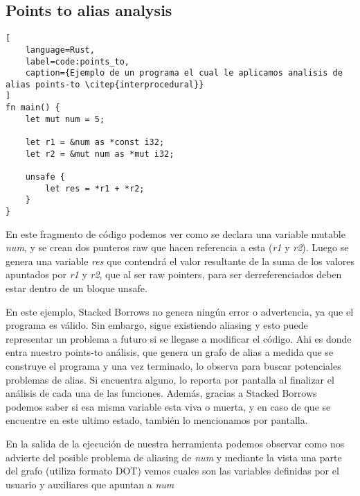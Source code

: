 \subsection{Points to alias analysis}

\begin{lstlisting}[
    language=Rust,
    label=code:points_to,
    caption={Ejemplo de un programa el cual le aplicamos analisis de alias points-to \citep{interprocedural}}
]
fn main() {
    let mut num = 5;

    let r1 = &num as *const i32;
    let r2 = &mut num as *mut i32;

    unsafe {
        let res = *r1 + *r2;
    }
}
\end{lstlisting}

En este fragmento de código podemos ver como se declara una variable mutable \textit{num}, y se crean dos punteros raw que hacen referencia a esta (\textit{r1} y \textit{r2}). Luego se genera una variable \textit{res} que contendrá el valor resultante de la suma de los valores apuntados por \textit{r1} y \textit{r2}, que al ser raw pointers, para ser derreferenciados deben estar dentro de un bloque unsafe.

En este ejemplo, Stacked Borrows no genera ningún error o advertencia, ya que el programa es válido. Sin embargo, sigue existiendo aliasing y esto puede representar un problema a futuro si se llegase a modificar el código. Ahi es donde entra nuestro points-to análisis, que genera un grafo de alias a medida que se construye el programa y una vez terminado, lo observa para buscar potenciales problemas de alias. Si encuentra alguno, lo reporta por pantalla al finalizar el análisis de cada una de las funciones. Además, gracias a Stacked Borrows podemos saber si esa misma variable esta viva o muerta, y en caso de que se encuentre en este ultimo estado, también lo mencionamos por pantalla.

En la salida de la ejecución de nuestra herramienta podemos observar como nos advierte del posible problema de aliasing de \textit{num} y mediante la vista una parte del grafo (utiliza formato DOT) vemos cuales son las variables definidas por el usuario y auxiliares que apuntan a \textit{num}

